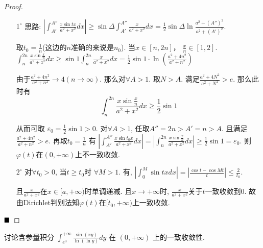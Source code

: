 \documentclass[lang=cn,newtx,10pt,scheme=chinese]{elegantbook}
\begin{document}
\begin{proof}
\begin{enumerate}
    \item[$1^{\circ}$] 思路: $\left|\int_{A'}^{A''} \frac{x \sin tx}{a^2+x^2} dx \right| \ge \sin \Delta \int_{A'}^{A''} \frac{x}{a^2+x^2} dx = \frac{1}{2} \sin \Delta \ln \frac{a^2+(A'')^2}{a^2+(A')^2}$.
    
    取$t_0 = \frac{1}{n}$(这边的$n$准确的来说是$n_0$). 当$x \in [n, 2n]$， $\frac{x}{n} \in [1, 2]$.
    $\int_{n}^{2n} \frac{x \sin \frac{x}{n}}{a^2+x^2} dx \ge \sin 1 \int_{n}^{2n} \frac{x}{a^2+x^2} dx = \frac{1}{2}\sin 1 \cdot \ln(\frac{a^2+4n^2}{a^2+n^2})$
    
    由于$\frac{a^2+4n^2}{a^2+n^2} \to 4 (n \to \infty)$. 那么对$\forall A > 1$. 取$N > A$. 满足$\frac{a^2+4N^2}{a^2+N^2} > e$. 那么此时有
    $$\int_{n}^{2n} \frac{x \sin \frac{x}{n}}{a^2+x^2} dx \ge \frac{1}{2}\sin 1$$
    
    从而可取 $\varepsilon_0 = \frac{1}{2}\sin 1 > 0$. 对$\forall A > 1$, 任取$A''=2n > A'=n > A$. 且满足$\frac{a^2+4n^2}{a^2+n^2} > e$. 再取$t_0=\frac{1}{n}$
    有 $\left|\int_{A'}^{A''} \frac{x \sin t_0 x}{a^2+x^2} dx \right| = \left|\int_{n}^{2n} \frac{x \sin \frac{x}{n}}{a^2+x^2} dx \right| \ge \frac{1}{2}\sin 1 = \varepsilon_0$. 则$\varphi(t)$在$(0, +\infty)$上不一致收敛.
    
    \item[$2^{\circ}$] 对$\forall t_0 > 0$, 当$t \ge t_0$时 $\forall M>1$. 有, $\left|\int_{0}^{M} \sin tx dx\right| = \left|\frac{\cos t-\cos Mt}{t}\right| \le \frac{2}{t_0}$.
    
    且$\frac{x}{a^2+x^2}$在$x \in [a, +\infty)$时单调递减. 且$x \to +\infty$时, $\frac{x}{a^2+x^2}$关于$t$一致收敛到$0$. 故由Dirichlet判别法知$\varphi(t)$在$[t_0, +\infty)$上一致收敛.
\end{enumerate}
$\hfill \blacksquare$
\end{proof}

\begin{example}[$\bigstar$]
讨论含参量积分 $\int_{e^3}^{+\infty} \frac{\sin(xy)}{\ln(\ln y)} dy$ 在 $(0, +\infty)$ 上的一致收敛性.
\end{example}
\end{document}
